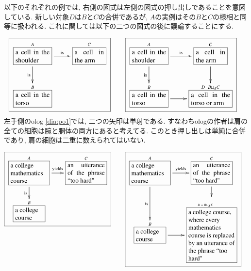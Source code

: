 \begin{example}[Pushout]\label{ex:pushout}


以下のそれぞれの例では, 右側の図式は左側の図式の押し出しであることを意図している. 新しい対象$D$は$B$と$C$の合併であるが, $A$の実例はその$B$と$C$の様相と同等に扱われる. これに関しては以下の二つの図式の後に議論することにする.

\begin{align}
\label{dia:po1}\fbox{\xymatrixnocompile{\obox{A}{.7in}{a cell in the shoulder}\LA{r}{is}\LAL{d}{is}&\obox{C}{.6in}{a cell in the arm}\\\obox{B}{.7in}{a cell in the torso}}}\hsp&\fbox{\xymatrix{\obox{A}{.7in}{a cell in the shoulder}\LA{r}{is}\LAL{d}{is}&\obox{C}{.6in}{a cell in the arm}\LA{d}{}\\\obox{B}{.7in}{a cell in the torso}\LA{r}{}&\obox{D=B\sqcup_AC}{.8in}{a cell in the torso or arm}}}
\end{align}
左手側のolog \eqref{dia:po1}では, 二つの矢印は単射である. すなわちologの作者は肩の全ての細胞は腕と胴体の両方にあると考えてる. このとき押し出しは単純に合併であり, 肩の細胞は二重に数えられてはいない.

\begin{align}\label{dia:po2}\fbox{\xymatrixnocompile@=18pt{\obox{A}{.8in}{\rr a college mathematics course}\LA{r}{yields}\LAL{d}{is}&\obox{C}{.8in}{an utterance of the phrase ``too hard"}\\\obox{B}{.6in}{\rr a college course}}}\hsp&\fbox{\xymatrixnocompile@=18pt{\obox{A}{.8in}{\rr a college mathematics course}\LA{r}{yields}\LAL{d}{is}&\obox{C}{.8in}{an utterance of the phrase ``too hard"}\LA{d}{}\\\obox{B}{.6in}{\rr a college course}\LA{r}{}&\obox{\parbox{.6in}{\vspace{.1in}\tiny$D=B\!\sqcup_A\!C$}}{1in}{\rr a college course, where every mathematics course is replaced by an utterance of the phrase ``too hard"}}}
\end{align}


\end{example}
